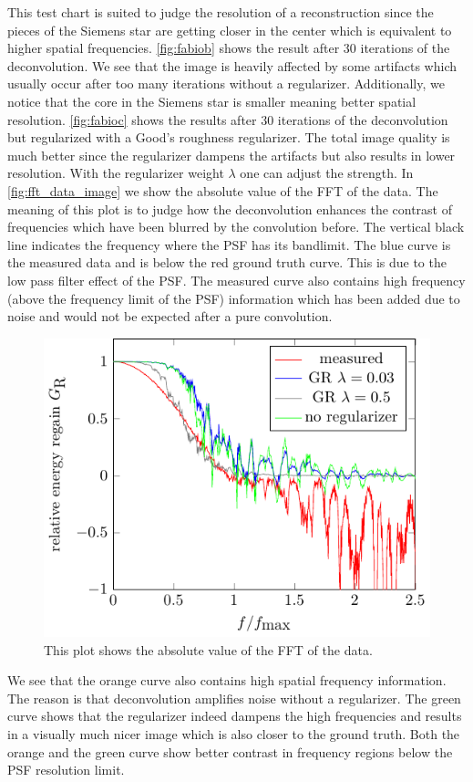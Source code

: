 \documentclass{juliacon}
\begin{document}
        This test chart is suited to judge the resolution of a reconstruction since the pieces of the Siemens star
        are getting closer in the center which is equivalent to higher spatial frequencies.
        \autoref{fig:fabiob} shows the result after 30 iterations of the deconvolution. 
        We see that the image is heavily affected by some artifacts which usually occur after too many iterations without a regularizer.
        Additionally, we notice that the core in the Siemens star is smaller meaning better spatial resolution. 
        \autoref{fig:fabioc} shows the results after 30 iterations of the deconvolution but regularized with a Good's roughness regularizer.
        The total image quality is much better since the regularizer dampens the artifacts but also results in lower
        resolution. With the regularizer weight $\lambda$ one can adjust the strength.
        In \autoref{fig:fft_data_image} we show the absolute value of the FFT of the data. 
        The meaning of this plot is to judge how the deconvolution enhances the contrast of frequencies which have 
        been blurred by the convolution before.
        The vertical black line indicates the frequency where the PSF has its bandlimit.
        The blue curve is the measured data and is below the red ground truth curve. This is due to the low pass filter effect of the PSF.
        The measured curve also contains high frequency (above the frequency limit of the PSF) information which has been added due to noise and would not be expected 
        after a pure convolution.
        \begin{figure}[h]
            \centering
            \includegraphics[width = .4\textwidth]{figures/test_chart_relative_energy_regain.pdf}
            \caption{This plot shows the absolute value of the FFT of the data.}
            \label{fig:fft_data_image}
        \end{figure}
        We see that the orange curve also contains high spatial frequency information. The reason is that deconvolution amplifies noise
        without a regularizer. The green curve shows that the regularizer indeed dampens the high frequencies and results in a visually much
        nicer image which is also closer to the ground truth.
        Both the orange and the green curve show better contrast in frequency regions below the PSF resolution limit.
\end{document}
